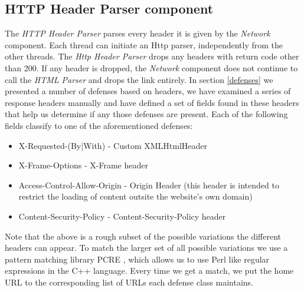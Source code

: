 \subsection{HTTP Header Parser component}
The \emph{HTTP Header Parser} parses every header it is given by the \emph{Network} component.  Each thread can 
initiate an Http parser, independently from the other threads.  The \emph{Http Header Parser} drops any headers
with return code other than 200.  If any header is dropped, the \emph{Network} component does not continue to call
the \emph{HTML Parser} and drops the link entirely.
In section \ref{defenses} we presented a number of defenses based on headers,
we have examined a series of response headers manually and have defined a set of fields found in these headers
that help us determine if any those defenses are present.  Each of the following fields classify to one of the 
aforementioned defenses: 
\begin{itemize}
	\item X-Requested-(By|With) - Custom XMLHtmlHeader
	\item X-Frame-Options - X-Frame header
	\item Access-Control-Allow-Origin - Origin Header (this header is intended to restrict the loading of content outsite
	the website's own domain)
	\item Content-Security-Policy - Content-Security-Policy header
\end{itemize}
Note that the above is a rough subset of the possible variations the different headers can appear.  To match the larger
set of all possible variations we use a pattern matching library PCRE \cite{website:pcre}, 
which allows us to use Perl like regular expressions in the C++ language. Every time we get a match, 
we put the home URL to the corresponding list of URLs each defense class maintains.

